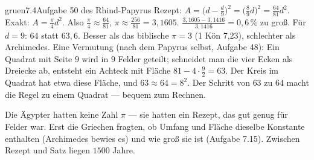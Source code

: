 \begin{loesungkarte}{gruen}{7.4}{Aufgabe 50 des Rhind-Papyrus}
Rezept: $A = \bigl(d - \frac d9\bigr)^{2} = \bigl(\frac{8}9d\bigr)^{2} = \frac{64}{81}d^{2}$. Exakt: $A = \frac\pi4d^{2}$. Also $\frac\pi4\approx\frac{64}{81}$, $\pi\approx\frac{256}{81} = 3{,}1605$.
$\frac{3{,}1605 - 3{,}1416}{3{,}1416} = 0{,}6\,\%$ zu groß. Für $d = 9$: $64$ statt $63{,}6$. Besser als das biblische $\pi = 3$ (1 Kön 7,23), schlechter als Archimedes.
Eine Vermutung (nach dem Papyrus selbst, Aufgabe 48): Ein Quadrat mit Seite $9$ wird in $9$ Felder geteilt; schneidet man die vier Ecken als Dreiecke ab, entsteht ein Achteck mit Fläche $81 - 4\cdot\frac{9}2 = 63$. Der Kreis im Quadrat hat etwa diese Fläche, und $63\approx64 = 8^{2}$. Der Schritt von $63$ zu $64$ macht die Regel zu einem Quadrat --- bequem zum Rechnen.
\begin{mitnehmen}\kastentext
Die Ägypter hatten keine Zahl $\pi$ --- sie hatten ein Rezept, das gut genug für Felder war. Erst die Griechen fragten, ob Umfang und Fläche dieselbe Konstante enthalten (Archimedes bewies es) und wie groß sie ist (Aufgabe 7.15). Zwischen Rezept und Satz liegen $1500$ Jahre.
\end{mitnehmen}
\end{loesungkarte}

